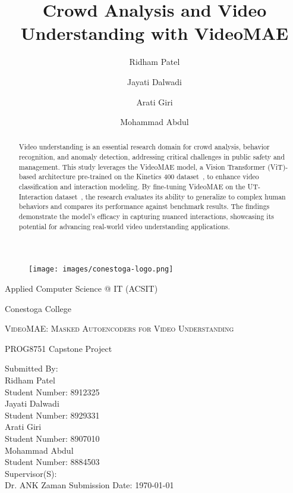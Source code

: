 \documentclass[runningheads]{llncs}
\begin{document}
	
	\begin{titlepage}
		\begin{figure}
			\centering
			\texttt{[image: images/conestoga-logo.png]}
		\end{figure}
		
		\setlength{\parindent}{12pt}
		\large
		\centering
		Applied Computer Science @ IT (ACSIT) \par
		Conestoga College \par
		\vspace{2cm}
		{\huge\scshape VideoMAE: Masked Autoencoders for Video Understanding\par}
		\vspace{2cm}
		{\LARGE PROG8751 Capstone Project\par}
		\vfill
		Submitted By: \\ 
		Ridham Patel \\ Student Number: 8912325 \\ 
		Jayati Dalwadi \\ Student Number: 8929331 \\ 
		Arati Giri \\ Student Number: 8907010 \\ 
		Mohammad Abdul \\ Student Number: 8884503 \\ 
		\vfill
		Supervisor(S): \\ 
		Dr. ANK Zaman
		\vfill
		\centering
		Submission Date: \today
	\end{titlepage}
	
	\title{Crowd Analysis and Video Understanding with VideoMAE}
	\author{Ridham Patel \and Jayati Dalwadi \and Arati Giri \and Mohammad Abdul}
	
	\maketitle
	
	\begin{abstract}
		Video understanding is an essential research domain for crowd analysis, behavior recognition, and anomaly detection, addressing critical challenges in public safety and management. This study leverages the VideoMAE model, a Vision Transformer (ViT)-based architecture pre-trained on the Kinetics 400 dataset~\cite{kinetics400}, to enhance video classification and interaction modeling. By fine-tuning VideoMAE on the UT-Interaction dataset~\cite{utdataset}, the research evaluates its ability to generalize to complex human behaviors and compares its performance against benchmark results. The findings demonstrate the model's efficacy in capturing nuanced interactions, showcasing its potential for advancing real-world video understanding applications.
	\end{abstract}
	
\end{document}
